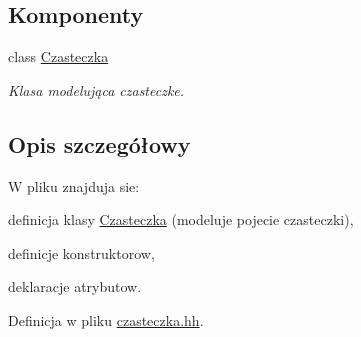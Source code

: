 \subsection*{Komponenty}
\begin{DoxyCompactItemize}
\item 
class \hyperlink{class_czasteczka}{Czasteczka}
\begin{DoxyCompactList}\small\item\em Klasa modelująca czasteczke. \end{DoxyCompactList}\end{DoxyCompactItemize}


\subsection{Opis szczegółowy}
W pliku znajduja sie\-:
\begin{DoxyItemize}
\item definicja klasy \hyperlink{class_czasteczka}{Czasteczka} (modeluje pojecie czasteczki),
\item definicje konstruktorow,
\item deklaracje atrybutow. 
\end{DoxyItemize}

Definicja w pliku \hyperlink{czasteczka_8hh_source}{czasteczka.\-hh}.

